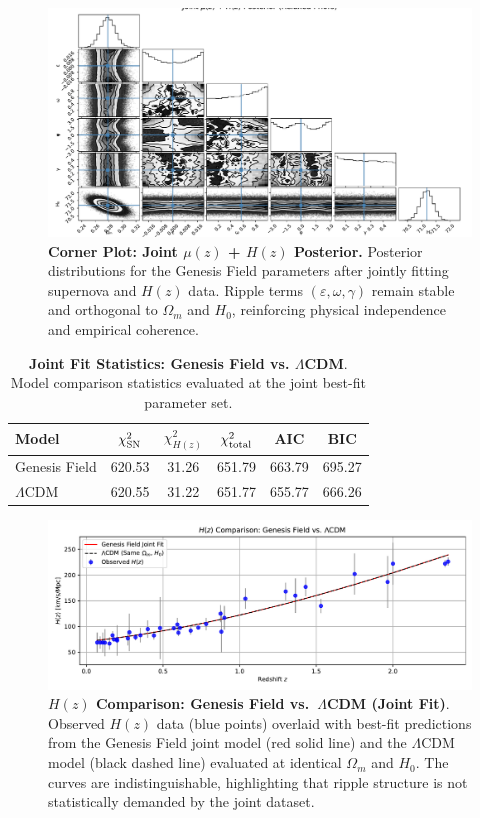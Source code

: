 \begin{figure}[htpb]
\centering
\includegraphics[width=\textwidth]{figures/joint_mcmc.pdf}
\caption{\textbf{Corner Plot: Joint $\mu(z)$ + $H(z)$ Posterior.} Posterior distributions for the Genesis Field parameters after jointly fitting supernova and $H(z)$ data. Ripple terms $(\varepsilon, \omega, \gamma)$ remain stable and orthogonal to $\Omega_m$ and $H_0$, reinforcing physical independence and empirical coherence.}
\label{fig:joint_corner}
\end{figure}

\begin{table}[htpb]
\centering
\caption{\textbf{Joint Fit Statistics: Genesis Field vs. $\Lambda$CDM}. Model comparison statistics evaluated at the joint best-fit parameter set.}
\vspace{0.5em}
\begin{tabular}{lccccc}
\hline
\textbf{Model} & $\chi^2_{\rm SN}$ & $\chi^2_{H(z)}$ & $\chi^2_{\rm total}$ & AIC & BIC \\
\hline
Genesis Field & 620.53 & 31.26 & 651.79 & 663.79 & 695.27 \\
$\Lambda$CDM  & 620.55 & 31.22 & 651.77 & 655.77 & 666.26 \\
\hline
\end{tabular}
\label{tab:joint_stats}
\end{table}

\begin{figure}[htpb]
\centering
\includegraphics[width=\textwidth]{figures/joint_hz_comparison.pdf}
\caption{\textbf{$H(z)$ Comparison: Genesis Field vs.\ $\Lambda$CDM (Joint Fit)}. Observed $H(z)$ data (blue points) overlaid with best-fit predictions from the Genesis Field joint model (red solid line) and the $\Lambda$CDM model (black dashed line) evaluated at identical $\Omega_m$ and $H_0$. The curves are indistinguishable, highlighting that ripple structure is not statistically demanded by the joint dataset.}
\label{fig:Hz_comparison}
\end{figure}

